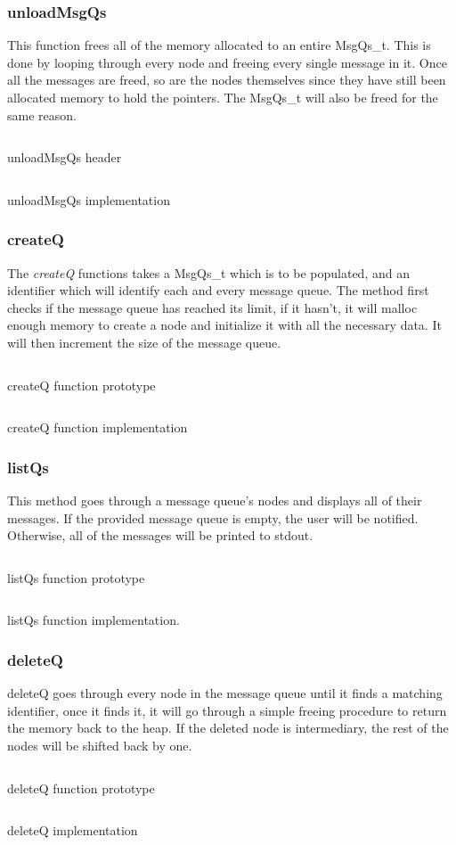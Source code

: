 \documentclass[a4paper, 12pt, titlepage]{article}
\newenvironment{code}{\captionsetup{type=listing}}{}
\newcommand{\sourcecode}[3]{
    \begin{code}
      \inputminted[linenos,numbersep=5pt,gobble=0,frame=lines,framesep=2mm,]{c}{#1}
        \caption{#2}
        \label{lst: #3}
    \end{code}
}
\begin{document}
\begin{onehalfspacing}
  \subsubsection{unloadMsgQs}
  This function frees all of the memory allocated to an entire MsgQs\_t. This is done by looping through every node and freeing every single message in it. Once all the messages are freed, so are the nodes themselves since they have still been allocated memory to hold the pointers. The MsgQs\_t will also be freed for the same reason.

  \sourcecode{snippets/unloadMsgQs_header.c}{unloadMsgQs header}{unloadMsgQs_header}
  \sourcecode{snippets/unloadMsgQs.c}{unloadMsgQs implementation}{unloadMsgQs}

  \subsubsection{createQ}
  The \emph{createQ} functions takes a MsgQs\_t which is to be populated, and an identifier which will identify each and every message queue. The method first checks if the message queue has reached its limit, if it hasn't, it will malloc enough memory to create a node and initialize it with all the necessary data. It will then increment the size of the message queue.

  \sourcecode{snippets/createQ_header.c}{createQ function prototype}{createQ_header}
  \sourcecode{snippets/createQ.c}{createQ function implementation}{createQ}

  \subsubsection{listQs}
  This method goes through a message queue's nodes and displays all of their messages. If the provided message queue is empty, the user will be notified. Otherwise, all of the messages will be printed to stdout.

  \sourcecode{snippets/listQs_header.c}{listQs function prototype}{listQs_header}
  \sourcecode{snippets/listQs.c}{listQs function implementation.}{listQs}

  \subsubsection{deleteQ}
  deleteQ goes through every node in the message queue until it finds a matching identifier, once it finds it, it will go through a simple freeing procedure to return the memory back to the heap. If the deleted node is intermediary, the rest of the nodes will be shifted back by one.
  \sourcecode{snippets/deleteQ_header.c}{deleteQ function prototype}{deleteQ_header}
  \sourcecode{snippets/deleteQ.c}{deleteQ implementation}{deleteQ}


\end{onehalfspacing}
\end{document}
